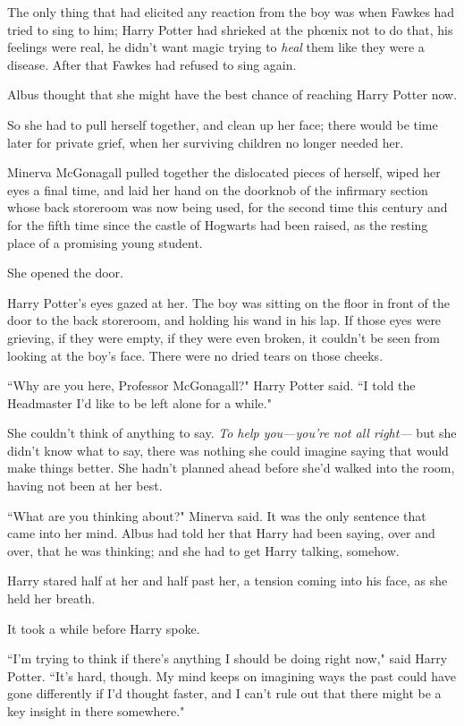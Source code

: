 The only thing that had elicited any reaction from the boy was when Fawkes had tried to sing to him; Harry Potter had shrieked at the phœnix not to do that, his feelings were real, he didn't want magic trying to \emph{heal} them like they were a disease. After that Fawkes had refused to sing again.

Albus thought that she might have the best chance of reaching Harry Potter now.

So she had to pull herself together, and clean up her face; there would be time later for private grief, when her surviving children no longer needed her.

Minerva McGonagall pulled together the dislocated pieces of herself, wiped her eyes a final time, and laid her hand on the doorknob of the infirmary section whose back storeroom was now being used, for the second time this century and for the fifth time since the castle of Hogwarts had been raised, as the resting place of a promising young student.

She opened the door.

Harry Potter's eyes gazed at her. The boy was sitting on the floor in front of the door to the back storeroom, and holding his wand in his lap. If those eyes were grieving, if they were empty, if they were even broken, it couldn't be seen from looking at the boy's face. There were no dried tears on those cheeks.

``Why are you here, Professor McGonagall?" Harry Potter said. ``I told the Headmaster I'd like to be left alone for a while."

She couldn't think of anything to say. \emph{To help you—you're not all right—} but she didn't know what to say, there was nothing she could imagine saying that would make things better. She hadn't planned ahead before she'd walked into the room, having not been at her best.

``What are you thinking about?" Minerva said. It was the only sentence that came into her mind. Albus had told her that Harry had been saying, over and over, that he was thinking; and she had to get Harry talking, somehow.

Harry stared half at her and half past her, a tension coming into his face, as she held her breath.

It took a while before Harry spoke.

``I'm trying to think if there's anything I should be doing right now," said Harry Potter. ``It's hard, though. My mind keeps on imagining ways the past could have gone differently if I'd thought faster, and I can't rule out that there might be a key insight in there somewhere."

